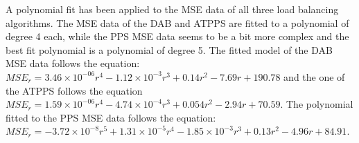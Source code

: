 A polynomial fit has been applied to the MSE data of all three load balancing algorithms. The MSE data of the DAB and ATPPS are fitted to a polynomial of degree 4 each, while the PPS MSE data seems to be a bit more complex and the best fit polynomial is a polynomial of degree 5. The fitted model of the DAB MSE data follows the equation: $MSE_r=3.46\times 10^{-06}r^{4}-1.12\times 10^{-3}r^{3}+0.14r^{2}-7.69r+190.78$ and the one of the ATPPS follows the equation $MSE_r=1.59\times 10^{-06}r^{4}-4.74\times 10^{-4}r^{3}+0.054r^{2}-2.94r+70.59$. The polynomial fitted to the PPS MSE data follows the equation: $MSE_r=-3.72\times 10^{-8}r^{5}+1.31\times 10^{-5}r^{4}-1.85\times 10^{-3}r^{3}+0.13r^{2}-4.96r+84.91$.
%
%
%

